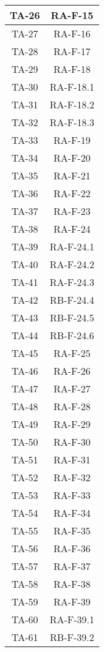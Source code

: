 \begin{center}
\begin{longtable}{|c|c|}
			\hline
			TA-26 & RA-F-15 \\
			\hline
			TA-27 & RA-F-16 \\
			\hline
			TA-28 & RA-F-17 \\
			\hline
			TA-29 & RA-F-18 \\
			\hline
			TA-30 & RA-F-18.1 \\
			\hline
			TA-31 & RA-F-18.2 \\
			\hline
			TA-32 & RA-F-18.3 \\
			\hline
			TA-33 & RA-F-19 \\
			\hline
			TA-34 & RA-F-20 \\
			\hline
			TA-35 & RA-F-21 \\
			\hline
			TA-36 & RA-F-22 \\
			\hline
			TA-37 & RA-F-23 \\
			\hline
			TA-38 & RA-F-24 \\
			\hline
			TA-39 & RA-F-24.1 \\
			\hline
			TA-40 & RA-F-24.2 \\
			\hline
			TA-41 & RA-F-24.3 \\
			\hline
			TA-42 & RB-F-24.4 \\
			\hline
			TA-43 & RB-F-24.5 \\
			\hline
			TA-44 & RB-F-24.6 \\
			\hline
			TA-45 & RA-F-25 \\
			\hline
			TA-46 & RA-F-26 \\
			\hline
			TA-47 & RA-F-27 \\
			\hline
			TA-48 & RA-F-28 \\
			\hline
			TA-49 & RA-F-29 \\
			\hline
			TA-50 & RA-F-30 \\
			\hline
			TA-51 & RA-F-31 \\
			\hline
			TA-52 & RA-F-32 \\
			\hline
			TA-53 & RA-F-33 \\
			\hline
			TA-54 & RA-F-34 \\
			\hline
			TA-55 & RA-F-35 \\
			\hline
			TA-56 & RA-F-36 \\
			\hline
			TA-57 & RA-F-37 \\
			\hline
			TA-58 & RA-F-38 \\
			\hline
			TA-59 & RA-F-39 \\
			\hline
			TA-60 & RA-F-39.1 \\
			\hline
			TA-61 & RB-F-39.2 \\

\end{longtable}
\end{center}
